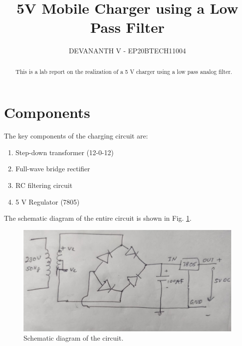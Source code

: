 \documentclass[journal,12pt,twocolumn]{IEEEtran}
\begin{document}
	\let\StandardTheFigure\thefigure
	\renewcommand{\thefigure}{\arabic{section}.\arabic{figure}}
	\makeatletter
	\makeatother
	
	
	\def\putbox#1#2#3{\makebox[0in][l]{\makebox[#1][l]{}\raisebox{\baselineskip}[0in][0in]{\raisebox{#2}[0in][0in]{#3}}}}
	\def\rightbox#1{\makebox[0in][r]{#1}}
	\def\centbox#1{\makebox[0in]{#1}}
	\def\topbox#1{\raisebox{-\baselineskip}[0in][0in]{#1}}
	\def\midbox#1{\raisebox{-0.5\baselineskip}[0in][0in]{#1}}
	
	
	\title{5V Mobile Charger using a Low Pass Filter}
	\author{DEVANANTH V - EP20BTECH11004}
	\maketitle
	\tableofcontents
	\renewcommand{\thetable}{\theenumi}
	\bigskip
	\begin{abstract}
		This is a lab report on the realization of a 5 V charger using
		a low pass analog filter.
	\end{abstract}
	\section{Components}
	The key components of the charging circuit are:
	\begin{enumerate}
		\item Step-down transformer (12-0-12)
		\item Full-wave bridge rectifier
		\item RC filtering circuit
		\item 5 V Regulator (7805)
	\end{enumerate}
	
	The schematic diagram of the entire circuit is shown in Fig. \ref{fig:ckt}.
	\begin{figure}[!htb]
		\includegraphics[width=\columnwidth]{figs/c.jpg}
		\caption{Schematic diagram of the circuit.}
		\label{fig:ckt}
	\end{figure}
\end{document}
